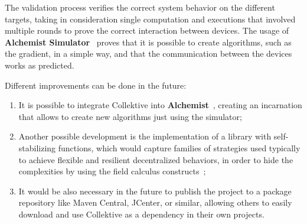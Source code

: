 The validation process verifies the correct system behavior on the different targets, taking in consideration single computation and executions that involved multiple rounds to prove the correct interaction between devices.\newline
The usage of \textbf{Alchemist Simulator}~\cite{alchemist} proves that it is possible to create algorithms, such as the gradient, in a simple way, and that the communication between the devices works as predicted. 

Different improvements can be done in the future:
\begin{enumerate}
    \item It is possible to integrate Collektive into \textbf{Alchemist}~\cite{alchemist}, creating an incarnation that allows to create new algorithms just using the simulator;
    \item Another possible development is the implementation of a library with self-stabilizing functions, which would capture families of strategies used typically to achieve flexible and resilient decentralized behaviors, in order to hide the complexities by using the field calculus constructs~\cite{self_stabilisation_functions};
    \item It would be also necessary in the future to publish the project to a package repository like Maven Central, JCenter, or similar, allowing others to easily download and use Collektive as a dependency in their own projects.
\end{enumerate}